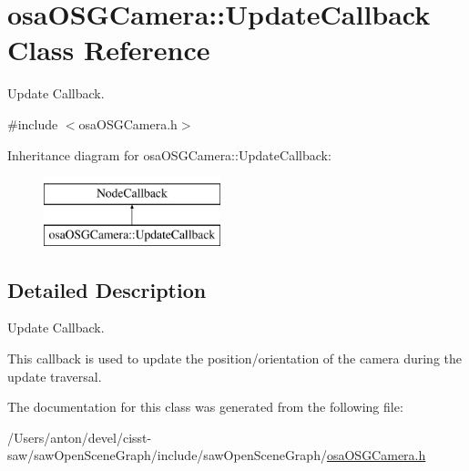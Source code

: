 \hypertarget{classosa_o_s_g_camera_1_1_update_callback}{}\section{osa\+O\+S\+G\+Camera\+:\+:Update\+Callback Class Reference}
\label{classosa_o_s_g_camera_1_1_update_callback}


Update Callback.  




{\ttfamily \#include $<$osa\+O\+S\+G\+Camera.\+h$>$}

Inheritance diagram for osa\+O\+S\+G\+Camera\+:\+:Update\+Callback\+:\begin{figure}[H]
\begin{center}
\leavevmode
\includegraphics[height=2.000000cm]{dc/d3c/classosa_o_s_g_camera_1_1_update_callback}
\end{center}
\end{figure}


\subsection{Detailed Description}
Update Callback. 

This callback is used to update the position/orientation of the camera during the update traversal. 

The documentation for this class was generated from the following file\+:\begin{DoxyCompactItemize}
\item 
/\+Users/anton/devel/cisst-\/saw/saw\+Open\+Scene\+Graph/include/saw\+Open\+Scene\+Graph/\hyperlink{osa_o_s_g_camera_8h}{osa\+O\+S\+G\+Camera.\+h}\end{DoxyCompactItemize}
